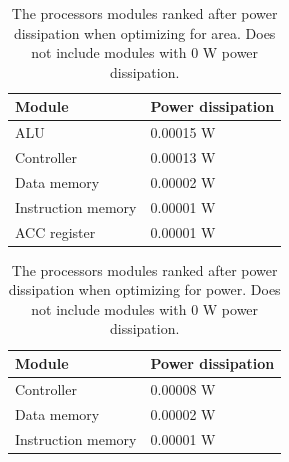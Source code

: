 \documentclass[a4paper,11pt]{article}
\begin{document}
\begin{appendix}
\begin{table}[h!]
\centering
\begin{tabular}{|l|l|} \hline
  \textbf{Module} & \textbf{Power dissipation}\\ \hline
  ALU & 0.00015 W \\
  Controller & 0.00013 W \\
  Data memory & 0.00002 W \\ 
  Instruction memory & 0.00001 W \\
  ACC register & 0.00001 W \\ \hline
\end{tabular}
\caption{The processors modules ranked after power dissipation when optimizing for area. Does not include modules with 0 W power dissipation.}
\label{tab:power_rank_area}
\end{table}

\begin{table}[h!]
\centering
\begin{tabular}{|l|l|} \hline
  \textbf{Module} & \textbf{Power dissipation}\\ \hline
  Controller & 0.00008 W \\
  Data memory & 0.00002 W \\ 
  Instruction memory & 0.00001 W \\ \hline
\end{tabular}
\caption{The processors modules ranked after power dissipation when optimizing for power. Does not include modules with 0 W power dissipation.}
\label{tab:power_rank_pow}
\end{table}

\end{appendix}
\end{document}

